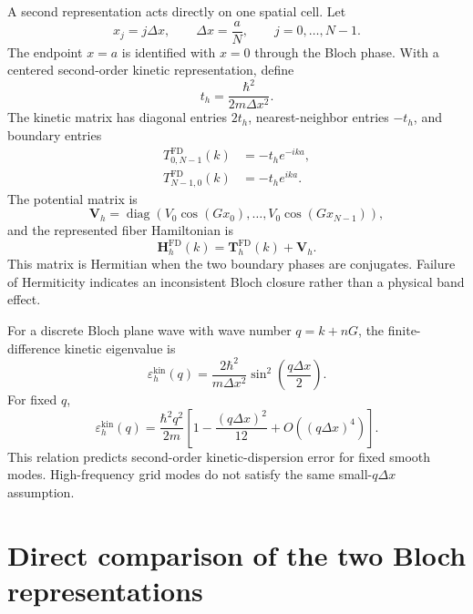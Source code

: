 A second representation acts directly on one spatial cell. Let
\begin{equation}
    x_j=j\Delta x,
    \qquad
    \Delta x=\frac{a}{N},
    \qquad
    j=0,\ldots,N-1.
\end{equation}
The endpoint $x=a$ is identified with $x=0$ through the Bloch phase. With a
centered second-order kinetic representation, define
\begin{equation}
    t_h=\frac{\hbar^2}{2m\Delta x^2}.
\end{equation}
The kinetic matrix has diagonal entries $2t_h$, nearest-neighbor entries
$-t_h$, and boundary entries
\begin{align}
    T^{\mathrm{FD}}_{0,N-1}(k)&=-t_h e^{-ika},
    \\
    T^{\mathrm{FD}}_{N-1,0}(k)&=-t_h e^{ika}.
\end{align}
The potential matrix is
\begin{equation}
    \mathbf V_h
    =
    \operatorname{diag}
    \left(
        V_0\cos(Gx_0),\ldots,
        V_0\cos(Gx_{N-1})
    \right),
\end{equation}
and the represented fiber Hamiltonian is
\begin{equation}
    \mathbf H_h^{\mathrm{FD}}(k)
    =
    \mathbf T_h^{\mathrm{FD}}(k)
    +
    \mathbf V_h.
\end{equation}
This matrix is Hermitian when the two boundary phases are conjugates. Failure
of Hermiticity indicates an inconsistent Bloch closure rather than a physical
band effect.

For a discrete Bloch plane wave with wave number $q=k+nG$, the finite-difference
kinetic eigenvalue is
\begin{equation}
    \varepsilon_h^{\mathrm{kin}}(q)
    =
    \frac{2\hbar^2}{m\Delta x^2}
    \sin^2\left(\frac{q\Delta x}{2}\right).
\end{equation}
For fixed $q$,
\begin{equation}
    \varepsilon_h^{\mathrm{kin}}(q)
    =
    \frac{\hbar^2q^2}{2m}
    \left[
        1-
        \frac{(q\Delta x)^2}{12}
        +O\!\left((q\Delta x)^4\right)
    \right].
\end{equation}
This relation predicts second-order kinetic-dispersion error for fixed smooth
modes. High-frequency grid modes do not satisfy the same small-$q\Delta x$
assumption.

\section*{Direct comparison of the two Bloch representations}

